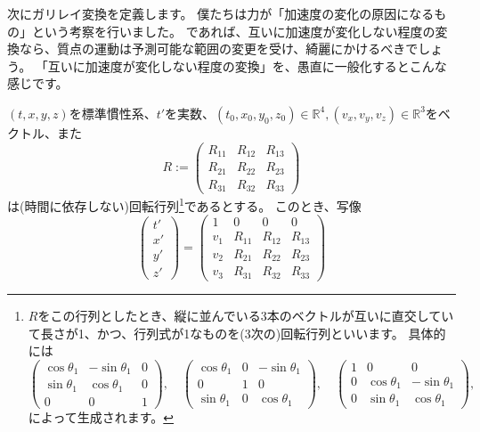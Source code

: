 次にガリレイ変換を定義します。
僕たちは力が「加速度の変化の原因になるもの」という考察を行いました。
であれば、互いに加速度が変化しない程度の変換なら、質点の運動は予測可能な範囲の変更を受け、綺麗にかけるべきでしょう。
「互いに加速度が変化しない程度の変換」を、愚直に一般化するとこんな感じです。
\begin{definition}[ガリレイ変換と慣性系]
  $(t,x,y,z)$を標準慣性系、$t'$を実数、$(t_0,x_0,y_0,z_0)\in\mathbb{R}^4, (v_x,v_y,v_z)\in\mathbb{R}^3$をベクトル、また
  \[
    R:=
    \begin{pmatrix}
      R_{11} & R_{12} & R_{13} \\
      R_{21} & R_{22} & R_{23} \\
      R_{31} & R_{32} & R_{33}
    \end{pmatrix}
  \]
  は(時間に依存しない)回転行列\footnote{
    $R$をこの行列としたとき、縦に並んでいる3本のベクトルが互いに直交していて長さが1、かつ、行列式が1なものを(3次の)回転行列といいます。
    具体的には
    \[
      \begin{pmatrix}
        \cos\theta_1 & -\sin\theta_1 & 0 \\
        \sin\theta_1 & \cos\theta_1 & 0 \\
        0 & 0 & 1
      \end{pmatrix},\quad
      \begin{pmatrix}
        \cos\theta_1 & 0 & -\sin\theta_1 \\
        0 & 1 & 0 \\
        \sin\theta_1 & 0 & \cos\theta_1
      \end{pmatrix},\quad
      \begin{pmatrix}
        1 & 0 & 0 \\
        0 & \cos\theta_1 & -\sin\theta_1 \\
        0 & \sin\theta_1 & \cos\theta_1
      \end{pmatrix},\quad
    \]
    によって生成されます。
  }であるとする。
  このとき、写像
  \[
    \begin{pmatrix}
      t'\\x'\\y'\\z'
    \end{pmatrix}
    =
    \begin{pmatrix}
      1 & 0 & 0 & 0 \\
      v_1 & R_{11} & R_{12} & R_{13} \\
      v_2 & R_{21} & R_{22} & R_{23} \\
      v_3 & R_{31} & R_{32} & R_{33}

\end{pmatrix}\]
\end{definition}

